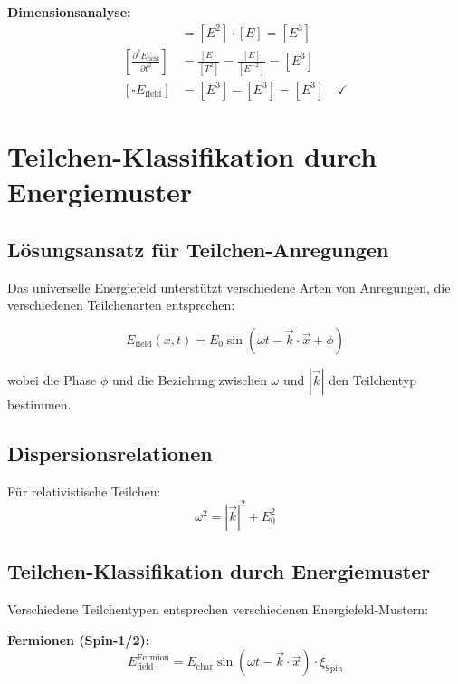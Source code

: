 \documentclass[12pt,a4paper]{report}
\begin{document}
	\textbf{Dimensionsanalyse:}
	\begin{align}
		[\nabla^2 E_{\text{field}}] &= [E^2] \cdot [E] = [E^3] \\
		\left[\frac{\partial^2 E_{\text{field}}}{\partial t^2}\right] &= \frac{[E]}{[T^2]} = \frac{[E]}{[E^{-2}]} = [E^3] \\
		[\square E_{\text{field}}] &= [E^3] - [E^3] = [E^3] \quad \checkmark
	\end{align}
	
	\section{Teilchen-Klassifikation durch Energiemuster}
	\label{sec:particle_classification}
	
	\subsection{Lösungsansatz für Teilchen-Anregungen}
	\label{subsec:solution_ansatz}
	
	Das universelle Energiefeld unterstützt verschiedene Arten von Anregungen, die verschiedenen Teilchenarten entsprechen:
	
	\begin{equation}
		E_{\text{field}}(x,t) = E_0 \sin(\omega t - \vec{k} \cdot \vec{x} + \phi)
	\end{equation}
	
	wobei die Phase $\phi$ und die Beziehung zwischen $\omega$ und $|\vec{k}|$ den Teilchentyp bestimmen.
	
	\subsection{Dispersionsrelationen}
	
	Für relativistische Teilchen:
	\begin{equation}
		\omega^2 = |\vec{k}|^2 + E_0^2
	\end{equation}
	
	\subsection{Teilchen-Klassifikation durch Energiemuster}
	\label{subsec:energy_patterns}
	
	Verschiedene Teilchentypen entsprechen verschiedenen Energiefeld-Mustern:
	
	\textbf{Fermionen (Spin-1/2):}
	\begin{equation}
		E_{\text{field}}^{\text{Fermion}} = E_{\text{char}} \sin(\omega t - \vec{k} \cdot \vec{x}) \cdot \xi_{\text{Spin}}
	\end{equation}
	
\end{document}
